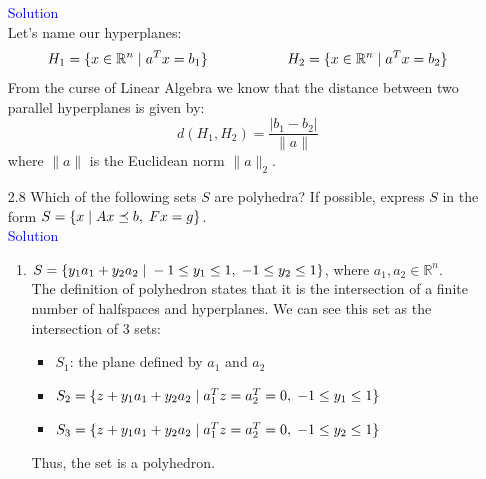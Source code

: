 \documentclass[12pt, oneside]{article}%
\def\R{{\mathbb R}}
\begin{document}
\begin{enumerate}[font=\bfseries]
\Large\textsf{\textcolor{blue}{Solution}}
\normalsize\\

Let's name our hyperplanes:
$$H_1=\{x \in \R^n \hspace{0.1cm} |\hspace{0.1cm} a^T x = b_1\} \hspace{2cm} H_2=\{x \in \R^n \hspace{0.1cm} |\hspace{0.1cm} a^T x = b_2\}$$
From the curse of Linear Algebra we know that the distance between two parallel hyperplanes is given by:
$$d(H_1,H_2)=\frac{|b_1-b_2|}{\|a\|}$$
where $\|a\|$ is the Euclidean norm $\|a\|_2$.\\

\item [2.8] Which of the following sets $S$ are polyhedra? If possible, express $S$ in the form $S = \{x \hspace{0.1cm}|\hspace{0.1cm} Ax \preceq b, \hspace{0.1cm} Fx = g\}$.\\

\Large\textsf{\textcolor{blue}{Solution}}
\normalsize
\begin{enumerate}
\item $S = \{y_1 a_1 + y_2 a_2 \hspace{0.1cm} | \hspace{0.1cm} -1 \leq y_1 \leq 1, \hspace{0.1cm} -1 \leq y_2 \leq 1\}$, where $a_1, a_2 \in \R^n.$\\

The definition of polyhedron states that it is the intersection of a finite number of halfspaces and hyperplanes. We can see this set as the intersection of 3 sets:

\begin{itemize}
    \item $S_1$: the plane defined by $a_1$ and $a_2$
    \item $S_2=\{ z+y_1a_1+y_2a_2 \hspace{0.1cm} | \hspace{0.1cm} a_1^T z = a_2^T = 0, \hspace{0.1cm} -1 \leq y_1 \leq 1 \}$
    \item $S_3=\{ z+y_1a_1+y_2a_2 \hspace{0.1cm} | \hspace{0.1cm} a_1^T z = a_2^T = 0, \hspace{0.1cm} -1 \leq y_2 \leq 1 \}$
\end{itemize}
Thus, the set is a polyhedron.\\


\end{enumerate}
\end{enumerate}
\end{document}
